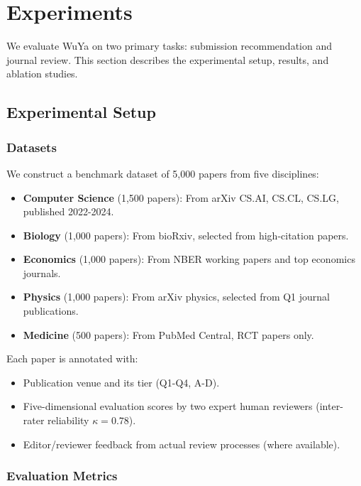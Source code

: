 \section{Experiments}
\label{sec:experiments}

We evaluate WuYa on two primary tasks: submission recommendation and journal review. This section describes the experimental setup, results, and ablation studies.

\subsection{Experimental Setup}

\subsubsection{Datasets}

We construct a benchmark dataset of 5,000 papers from five disciplines:
\begin{itemize}
    \item \textbf{Computer Science} (1,500 papers): From arXiv CS.AI, CS.CL, CS.LG, published 2022-2024.
    \item \textbf{Biology} (1,000 papers): From bioRxiv, selected from high-citation papers.
    \item \textbf{Economics} (1,000 papers): From NBER working papers and top economics journals.
    \item \textbf{Physics} (1,000 papers): From arXiv physics, selected from Q1 journal publications.
    \item \textbf{Medicine} (500 papers): From PubMed Central, RCT papers only.
\end{itemize}

Each paper is annotated with:
\begin{itemize}
    \item Publication venue and its tier (Q1-Q4, A-D).
    \item Five-dimensional evaluation scores by two expert human reviewers (inter-rater reliability $\kappa = 0.78$).
    \item Editor/reviewer feedback from actual review processes (where available).
\end{itemize}

\subsubsection{Evaluation Metrics}

